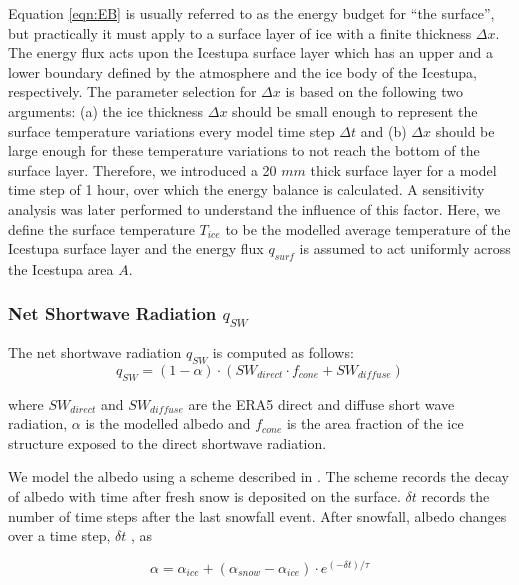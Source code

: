 \documentclass[utf8]{frontiersSCNS} %
\begin{document}
Equation \ref{eqn:EB} is usually referred to as the energy budget for “the surface”, but practically it must apply to
a surface layer of ice with a finite thickness $\Delta x$. The energy flux acts upon the Icestupa surface layer which
has an upper and a lower boundary defined by the atmosphere and the ice body of the Icestupa, respectively. The
parameter selection for $\Delta x$ is based on the following two arguments: (a) the ice thickness $\Delta x$ should be
small enough to represent the surface temperature variations every model time step $\Delta t$ and (b) $\Delta x$ should
be large enough for these temperature variations to not reach the bottom of the surface layer.  Therefore, we introduced
a 20 $mm$ thick surface layer for a model time step of 1 hour, over which the energy balance is calculated. A
sensitivity analysis was later performed to understand the influence of this factor. Here, we define the surface
temperature $T_{ice}$ to be the modelled average temperature of the Icestupa surface layer and the energy flux $q_{surf}$
is assumed to act uniformly across the Icestupa area $A$.

\subsubsection{Net Shortwave Radiation \texorpdfstring{$q_{SW}$}{Lg}} 
The net shortwave radiation $q_{SW}$ is computed as follows:
\begin{equation} q_{SW} = (1- \alpha)\cdot (SW_{direct} \cdot f_{cone} + SW_{diffuse}) \label{eqn:SW} \end{equation}

where $SW_{direct}$ and $SW_{diffuse}$ are the ERA5 direct and diffuse short wave radiation, $\alpha$ is the modelled
albedo and $f_{cone}$ is the area fraction of the ice structure exposed to the direct shortwave radiation.

We model the albedo using a scheme described in \cite{OerlemansKnap_1998}. The scheme records the decay of albedo with
time after fresh snow is deposited on the surface. $\delta t$ records the number of time steps after the last snowfall
event. After snowfall, albedo changes over a time step, $\delta t$ , as

\begin{equation} \alpha=\alpha_{ice}+(\alpha_{snow}-\alpha_{ice}) \cdot e^{(-\delta t)/\tau} \label{eqn:a}
\end{equation}
\end{document}
